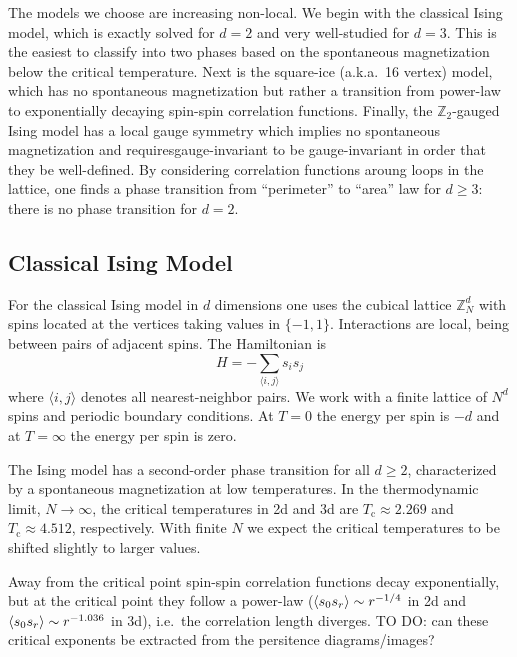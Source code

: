 \documentclass[11pt]{article}
\begin{document}
The models we choose are increasing non-local. We begin with the classical Ising model, which is exactly solved for $d=2$ and very well-studied for $d=3$. This is the easiest to classify into two phases based on the spontaneous magnetization below the critical temperature. Next is the square-ice (a.k.a.~16 vertex) model, which has no spontaneous magnetization but rather a transition from power-law to exponentially decaying spin-spin correlation functions. Finally, the $\mathbb{Z}_2$-gauged Ising model has a local gauge symmetry which implies no spontaneous magnetization and requiresgauge-invariant to be gauge-invariant in order that they be well-defined. By considering correlation functions aroung loops in the lattice, one finds a phase transition from ``perimeter'' to ``area'' law for $d\geq 3$: there is no phase transition for $d=2$.

\subsection{Classical Ising Model}
For the classical Ising model in $d$ dimensions one uses the cubical lattice $\mathbb{Z}_N^d$ with spins located at the vertices taking values in $\{{-1},1\}$. Interactions are local, being between pairs of adjacent spins. The Hamiltonian is
\begin{equation}
    H = -\sum_{\langle i,j\rangle}s_is_j
\end{equation}
where $\langle i,j\rangle$ denotes all nearest-neighbor pairs. We work with a finite lattice of $N^d$ spins and periodic boundary conditions. At $T=0$ the energy per spin is $-d$ and at $T=\infty$ the energy per spin is zero.

The Ising model has a second-order phase transition for all $d\geq 2$, characterized by a spontaneous magnetization at low temperatures. In the thermodynamic limit, $N\to\infty$, the critical temperatures in 2d and 3d are $T_\text{c}\approx 2.269$ and $T_\text{c}\approx4.512$, respectively. With finite $N$ we expect the critical temperatures to be shifted slightly to larger values.

Away from the critical point spin-spin correlation functions decay exponentially, but at the critical point they follow a power-law ($\ev{s_0s_r}\sim r^{-1/4}$ in 2d and $\ev{s_0s_r}\sim r^{-1.036}$ in 3d), i.e.~the correlation length diverges. TO DO: can these critical exponents be extracted from the persitence diagrams/images?
\end{document}
